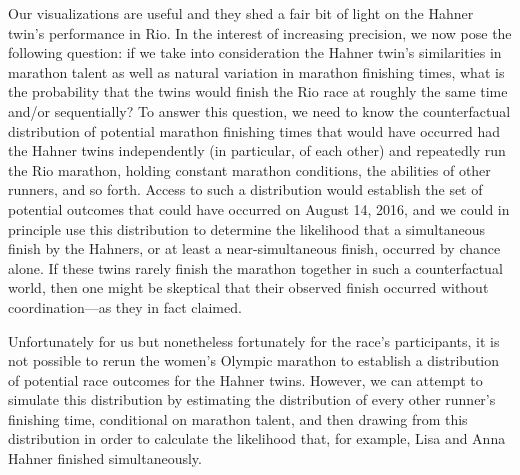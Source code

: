\documentclass[12pt,titlepage]{article}
\begin{document}
Our visualizations are useful and they shed a fair bit of light on the
Hahner twin's performance in Rio.  In the interest of increasing
precision, we now pose the following question: if we take into
consideration the Hahner twin's similarities in marathon talent as
well as natural variation in marathon finishing times, what is the
probability that the twins would finish the Rio race at roughly the
same time and/or sequentially?  To answer this question, we need to
know the counterfactual distribution of potential marathon finishing
times that would have occurred had the Hahner twins independently (in
particular, of each other) and repeatedly run the Rio marathon,
holding constant marathon conditions, the abilities of other runners,
and so forth.  Access to such a distribution would establish the set
of potential outcomes that could have occurred on August 14, 2016, and
we could in principle use this distribution to determine the
likelihood that a simultaneous finish by the Hahners, or at least a
near-simultaneous finish, occurred by chance alone.  If these twins
rarely finish the marathon together in such a counterfactual world,
then one might be skeptical that their observed finish occurred
without coordination---as they in fact claimed.

Unfortunately for us but nonetheless fortunately for the race's
participants, it is not possible to rerun the women's Olympic marathon
to establish a distribution of potential race outcomes for the Hahner
twins.  However, we can attempt to simulate this distribution by
estimating the distribution of every other runner's finishing time,
conditional on marathon talent, and then drawing from this
distribution in order to calculate the likelihood that, for example,
Lisa and Anna Hahner finished simultaneously.
\end{document}
